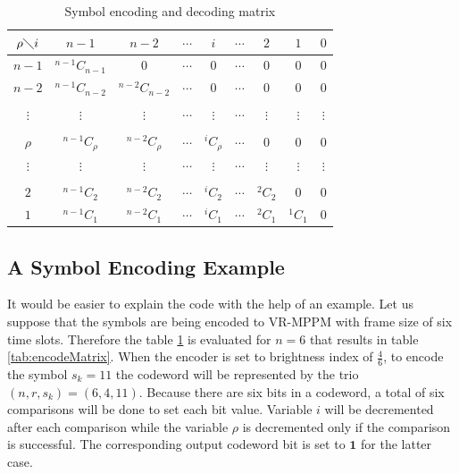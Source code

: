 \begin{table}[t]
\centering \caption{Symbol encoding and decoding matrix}
\begin{tabular}{c|c c c c c c c c} \hline \hline
$\rho \diagdown i$ & ${n-1}$ & ${n-2}$ & $\cdots$ & ${i}$& $\cdots$ & ${2}$ & ${1}$ & ${0}$ \\ \hline \hline
$n-1$ & $^{n-1}C_{n-1}$ & 0 & $\cdots$ & 0 & $\cdots$ & 0 & 0 & 0 \\ 
$n-2$ & $^{n-1}C_{n-2}$ & $^{n-2}C_{n-2}$ & $\cdots$ & 0 & $\cdots$ & 0 & 0 & 0 \\ 
\vspace{-6pt} \\
$\vdots$ & $\vdots$ & $\vdots$ & $\cdots$ & $\vdots$ & $\cdots$ & $\vdots$ & $\vdots$ & $\vdots$ \\ 
\vspace{-6pt} \\
$\rho$ & $^{n-1}C_{\rho}$ & $^{n-2}C_{\rho}$ & $\cdots$ & $^{i}C_{\rho}$ & $\cdots$ & 0 & 0 & 0 \\ 
$\vdots$ & $\vdots$ & $\vdots$ & $\cdots$ & $\vdots$ & $\cdots$ & $\vdots$ & $\vdots$ & $\vdots$ \\ 
\vspace{-6pt} \\
$2$ & $^{n-1}C_{2}$ & $^{n-2}C_{2}$ & $\cdots$ & $^{i}C_{2}$ & $\cdots$ & $^{2}C_{2}$ & 0 & 0 \\
$1$ & $^{n-1}C_{1}$ & $^{n-2}C_{1}$ & $\cdots$ & $^{i}C_{1}$ & $\cdots$ & $^{2}C_{1}$ & $^{1}C_{1}$ & 0 \\
\hline 
\end{tabular}
\label{tab:encode-decode}
\end{table}

\subsection{A Symbol Encoding Example}
It would be easier to explain the code with the help of an example. Let us suppose that the symbols are being encoded to VR-MPPM with frame size of six time slots. Therefore the table \ref{tab:encode-decode} is evaluated for $n=6$ that results in table \ref{tab:encodeMatrix}. When the encoder is set to brightness index of $\frac{4}{6}$, to encode the symbol $s_k=11$ the codeword will be represented by the trio $(n,r,s_k)=(6,4,11)$. Because there are six bits in a codeword, a total of six comparisons will be done to set each bit value. Variable $i$ will be decremented after each comparison while the variable $\rho$ is decremented only if the comparison is successful. The corresponding output codeword bit is set to $\mathbf{1}$ for the latter case.



